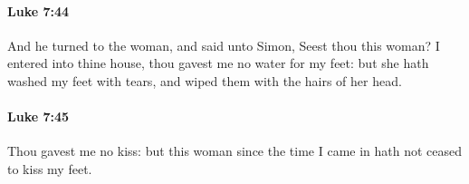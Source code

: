 		\paragraph{Luke 7:44} %
			\label{LUKE-7-44}

			And he turned to the woman, and said unto Simon, Seest thou this woman? I entered into thine house, thou gavest me no water for my feet: but she hath washed my feet with tears, and wiped them with the hairs of her head.

			\begin{framed}
			\scriptsize
				\begin{compactdesc}
					\item[SBLG] 
				\end{compactdesc}
			\end{framed}

		\paragraph{Luke 7:45} %
			\label{LUKE-7-45}

			Thou gavest me no kiss: but this woman since the time I came in hath not ceased to kiss my feet.

